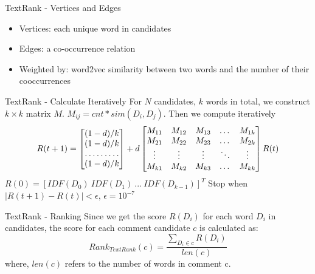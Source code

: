 \documentclass{beamer}
\begin{document}
    \begin{frame}{TextRank - Vertices and Edges}
      \begin{itemize}
        \item Vertices: each unique word in candidates
        \item Edges: a co-occurrence relation
        \item Weighted by: word2vec similarity between two words and the number of their cooccurrences
      \end{itemize}
    \end{frame}

    \begin{frame}{TextRank - Calculate Iteratively}
      For $N$ candidates, $k$ words in total, we construct $ k \times k $ 
      matrix $M$. $M_{ij} = cnt * sim(D_i, D_j)$. Then we compute iteratively
      \[
      R(t+1) = 
      \begin{bmatrix}
          (1-d)/k       \\
          (1-d)/k       \\
          \hdotsfor{1} \\
          (1-d)/k       
      \end{bmatrix}
      +d
      \begin{bmatrix}
          M_{11} & M_{12} & M_{13} & \dots  & M_{1k} \\
          M_{21} & M_{22} & M_{23} & \dots  & M_{2k} \\
          \vdots & \vdots & \vdots & \ddots & \vdots \\
          M_{k1} & M_{k2} & M_{k3} & \dots  & M_{kk}
      \end{bmatrix}
      R(t)
      \]
      $R(0) = [IDF(D_0) \ IDF(D_1) \ ... \ IDF(D_{k-1})]^T$ \newline
      Stop when $|R(t+1)-R(t)|<\epsilon$, $\epsilon = 10^{-7}$
    \end{frame}

    \begin{frame}{TextRank - Ranking}
      Since we get the score $R(D_i)$ for each word $D_i$ in candidates, the 
      score for each comment candidate $c$ is calculated as:
      \begin{equation}
        Rank_{TextRank}(c) = \frac{\sum_{D_i \in c}{R(D_i)}}{len(c)} 
      \end{equation}
      where, $len(c)$ refers to the number of words in comment c.
    \end{frame}
\end{document}
